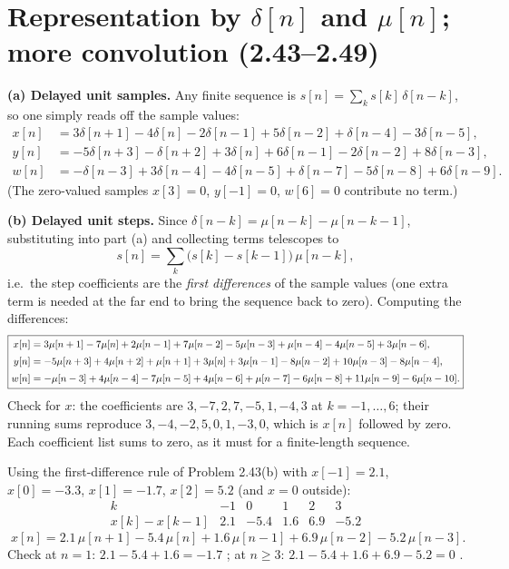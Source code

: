 \section{Representation by $\delta[n]$ and $\mu[n]$; more convolution (2.43--2.49)}


\textbf{(a) Delayed unit samples.} Any finite sequence is
$s[n]=\sum_k s[k]\,\delta[n-k]$, so one simply reads off the sample values:
\[
\boxed{
\begin{aligned}
x[n]&=3\delta[n+1]-4\delta[n]-2\delta[n-1]+5\delta[n-2]+\delta[n-4]-3\delta[n-5],\\
y[n]&=-5\delta[n+3]-\delta[n+2]+3\delta[n]+6\delta[n-1]-2\delta[n-2]+8\delta[n-3],\\
w[n]&=-\delta[n-3]+3\delta[n-4]-4\delta[n-5]+\delta[n-7]-5\delta[n-8]+6\delta[n-9].
\end{aligned}}
\]
(The zero-valued samples $x[3]=0$, $y[-1]=0$, $w[6]=0$ contribute no term.)

\textbf{(b) Delayed unit steps.} Since $\delta[n-k]=\mu[n-k]-\mu[n-k-1]$, substituting into
part (a) and collecting terms telescopes to
\[
s[n]=\sum_{k}\bigl(s[k]-s[k-1]\bigr)\,\mu[n-k],
\]
i.e.\ the step coefficients are the \emph{first differences} of the sample values (one extra
term is needed at the far end to bring the sequence back to zero). Computing the differences:
\[
\boxed{\small
\begin{aligned}
x[n]&=3\mu[n+1]-7\mu[n]+2\mu[n-1]+7\mu[n-2]-5\mu[n-3]+\mu[n-4]-4\mu[n-5]+3\mu[n-6],\\[2pt]
y[n]&=-5\mu[n+3]+4\mu[n+2]+\mu[n+1]+3\mu[n]+3\mu[n-1]-8\mu[n-2]+10\mu[n-3]-8\mu[n-4],\\[2pt]
w[n]&=-\mu[n-3]+4\mu[n-4]-7\mu[n-5]+4\mu[n-6]+\mu[n-7]-6\mu[n-8]+11\mu[n-9]-6\mu[n-10].
\end{aligned}}
\]
Check for $x$: the coefficients are
$3,-7,2,7,-5,1,-4,3$ at $k=-1,\dots,6$; their running sums reproduce
$3,-4,-2,5,0,1,-3,0$, which is $x[n]$ followed by zero. \checkmark
Each coefficient list sums to zero, as it must for a finite-length sequence.


Using the first-difference rule of Problem 2.43(b) with
$x[-1]=2.1$, $x[0]=-3.3$, $x[1]=-1.7$, $x[2]=5.2$ (and $x=0$ outside):
\[
\begin{array}{r|rrrrr}
k & -1 & 0 & 1 & 2 & 3\\\hline
x[k]-x[k-1] & 2.1 & -5.4 & 1.6 & 6.9 & -5.2
\end{array}
\]
\[
\boxed{\;x[n]=2.1\,\mu[n+1]-5.4\,\mu[n]+1.6\,\mu[n-1]+6.9\,\mu[n-2]-5.2\,\mu[n-3].\;}
\]
Check at $n=1$: $2.1-5.4+1.6=-1.7$ \checkmark; at $n\ge3$: $2.1-5.4+1.6+6.9-5.2=0$ \checkmark.

